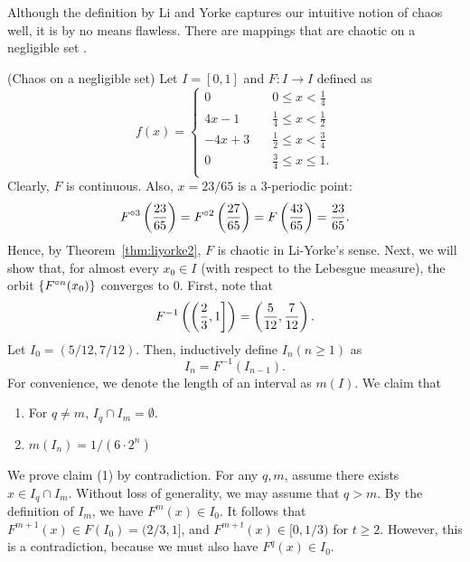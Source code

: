 \documentclass[12pt,draft,twoside]{book}
\begin{document}
Although the definition by Li and Yorke captures our intuitive notion of chaos well, it is by no means flawless.
There are mappings that are chaotic on a negligible set \citep{martelli98}.
\begin{example}
  (Chaos on a negligible set)
  Let $I = [0,1]$ and $F: I \to I$ defined as
  \begin{equation*}
    f(x) =
    \begin{cases}
      0 \quad & 0\leq x < \frac{1}{4} \\
      4x - 1 \quad  & \frac{1}{4} \leq x < \frac{1}{2} \\
      -4x + 3 \quad & \frac{1}{2} \leq x < \frac{3}{4} \\
      0 \quad & \frac{3}{4} \leq x \leq 1. \\
    \end{cases}
  \end{equation*}
  Clearly, $F$ is continuous.
  Also, $x = 23/65$ is a 3-periodic point:
  \begin{equation*}
    F^{\circ 3}\left ( \frac{23}{65} \right ) = F^{\circ 2}\left ( \frac{27}{65} \right ) = F\left ( \frac{43}{65} \right ) = \frac{23}{65}.
  \end{equation*}
Hence, by Theorem~\ref{thm:liyorke2}, $F$ is chaotic in Li-Yorke's sense.
%
Next, we will show that, for almost every $x_0 \in I$ (with respect to the Lebesgue measure), the orbit $\left \{ F^{\circ n}(x_0) \right \}$ converges to 0.
First, note that 
\begin{equation*}
  F^{-1}\left ( \left(\frac{2}{3},1\right] \right ) 
  = \left ( \frac{5}{12},\frac{7}{12} \right ).
\end{equation*}
Let $I_0 = (5/12, 7/12)$.
Then, inductively define $I_n (n\geq 1)$ as 
\begin{equation*}
  I_n = F^{-1}(I_{n-1}).
\end{equation*}
%
For convenience, we denote the length of an interval as $m(I)$.
We claim that
\begin{enumerate}[(1)]
  \item For $q\neq m$, $I_q \cap I_m = \emptyset$.
  \item $m(I_n) = 1/(6 \cdot 2^n)$
\end{enumerate}
%
We prove claim (1) by contradiction.
For any $q,m$, assume there exists $x \in I_q \cap I_m$. 
Without loss of generality, we may assume that $q > m$.
By the definition of $I_m$, we have $F^m(x) \in I_0$.
It follows that $F^{m+1}(x) \in F(I_0) = (2/3, 1]$, and $F^{m+t}(x) \in [0, 1/3)$ for $t \geq 2$.
However, this is a contradiction, because we must also have $F^q(x) \in I_0$.

\end{example}
\end{document}
